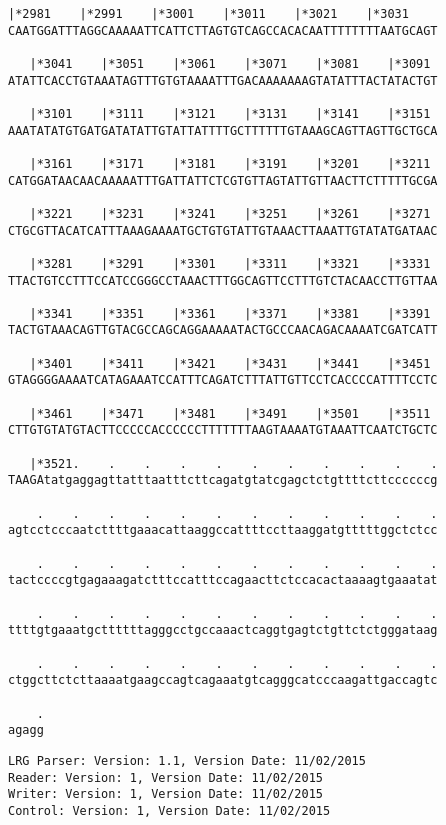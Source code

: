 \documentclass{article}
\begin{document}
\begin{Verbatim}[fontfamily=courier]
   |*2981    |*2991    |*3001    |*3011    |*3021    |*3031 
CAATGGATTTAGGCAAAAATTCATTCTTAGTGTCAGCCACACAATTTTTTTTAATGCAGT

   |*3041    |*3051    |*3061    |*3071    |*3081    |*3091 
ATATTCACCTGTAAATAGTTTGTGTAAAATTTGACAAAAAAAGTATATTTACTATACTGT

   |*3101    |*3111    |*3121    |*3131    |*3141    |*3151 
AAATATATGTGATGATATATTGTATTATTTTGCTTTTTTGTAAAGCAGTTAGTTGCTGCA

   |*3161    |*3171    |*3181    |*3191    |*3201    |*3211 
CATGGATAACAACAAAAATTTGATTATTCTCGTGTTAGTATTGTTAACTTCTTTTTGCGA

   |*3221    |*3231    |*3241    |*3251    |*3261    |*3271 
CTGCGTTACATCATTTAAAGAAAATGCTGTGTATTGTAAACTTAAATTGTATATGATAAC

   |*3281    |*3291    |*3301    |*3311    |*3321    |*3331 
TTACTGTCCTTTCCATCCGGGCCTAAACTTTGGCAGTTCCTTTGTCTACAACCTTGTTAA

   |*3341    |*3351    |*3361    |*3371    |*3381    |*3391 
TACTGTAAACAGTTGTACGCCAGCAGGAAAAATACTGCCCAACAGACAAAATCGATCATT

   |*3401    |*3411    |*3421    |*3431    |*3441    |*3451 
GTAGGGGAAAATCATAGAAATCCATTTCAGATCTTTATTGTTCCTCACCCCATTTTCCTC

   |*3461    |*3471    |*3481    |*3491    |*3501    |*3511 
CTTGTGTATGTACTTCCCCCACCCCCCTTTTTTTAAGTAAAATGTAAATTCAATCTGCTC

   |*3521.    .    .    .    .    .    .    .    .    .    .
TAAGAtatgaggagttatttaatttcttcagatgtatcgagctctgttttcttccccccg

    .    .    .    .    .    .    .    .    .    .    .    .
agtcctcccaatcttttgaaacattaaggccattttccttaaggatgtttttggctctcc

    .    .    .    .    .    .    .    .    .    .    .    .
tactccccgtgagaaagatctttccatttccagaacttctccacactaaaagtgaaatat

    .    .    .    .    .    .    .    .    .    .    .    .
ttttgtgaaatgcttttttagggcctgccaaactcaggtgagtctgttctctgggataag

    .    .    .    .    .    .    .    .    .    .    .    .
ctggcttctcttaaaatgaagccagtcagaaatgtcagggcatcccaagattgaccagtc

    .
agagg
\end{Verbatim}
\newpage
\begin{Verbatim}[fontfamily=courier]
LRG Parser: Version: 1.1, Version Date: 11/02/2015
Reader: Version: 1, Version Date: 11/02/2015
Writer: Version: 1, Version Date: 11/02/2015
Control: Version: 1, Version Date: 11/02/2015
\end{Verbatim}
\end{document}
